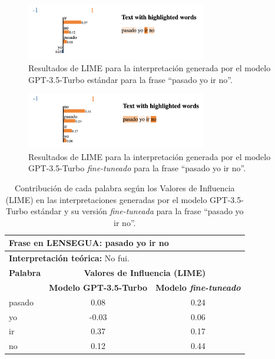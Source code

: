 \begin{figure}[H]
\centering
    \includegraphics[width=0.7\textwidth]{figuras/LIME/LIME-O3.png}
    \caption{Resultados de LIME para la interpretación generada por el modelo GPT-3.5-Turbo estándar para la frase “pasado yo ir no”.}
    \label{fig:LIME-O3}
\end{figure}

\begin{figure}[H]
\centering
    \includegraphics[width=0.7\textwidth]{figuras/LIME/LIME-F3.png}
    \caption{Resultados de LIME para la interpretación generada por el modelo GPT-3.5-Turbo \textit{fine-tuneado} para la frase “pasado yo ir no”.}
    \label{fig:LIME-F3}
\end{figure}

\vspace{0.5cm}
\begin{table}[H]
\centering
    \begin{tabular}{|l|c|c|}
        \hline
        \multicolumn{3}{|l|}{\textbf{Frase en LENSEGUA:} pasado yo ir no} \\ \hline
        \multicolumn{3}{|l|}{\textbf{Interpretación teórica:} No fui.} \\ \hline \hline
        
        \textbf{Palabra} & \multicolumn{2}{c|}{\textbf{Valores de Influencia (LIME)}} \\ 
        \cline{2-3}
         & \textbf{Modelo GPT-3.5-Turbo} & \textbf{Modelo \textit{fine-tuneado}} \\
         
        \hline
        pasado & 0.08 & 0.24 \\
        \hline
        yo & -0.03 & 0.06 \\
        \hline
        ir & 0.37  & 0.17 \\
        \hline
        no & 0.12  & 0.44 \\
        \hline
        
    \end{tabular}
\caption{Contribución de cada palabra según los Valores de Influencia (LIME) en las interpretaciones generadas por el modelo GPT-3.5-Turbo estándar y su versión \textit{fine-tuneada} para la frase “pasado yo ir no”.}
\label{tab:LIME-3}
\end{table}



